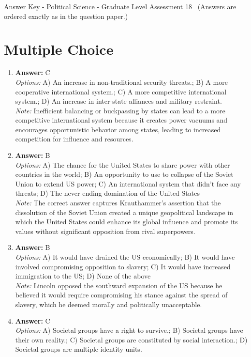 \documentclass[12pt]{article}
\begin{document}
\begin{center}
Answer Key - Political Science - Graduate Level Assessment 18 \
\small (Answers are ordered exactly as in the question paper.)
\end{center}

\section*{Multiple Choice}
\begin{enumerate}[label=\arabic*.]
\item \textbf{Answer:} C
\\ \textit{Options:} A) An increase in non-traditional security threats.; B) A more cooperative international system.; C) A more competitive international system.; D) An increase in inter-state alliances and military restraint.
\\ \textit{Note:} Inefficient balancing or buckpassing by states can lead to a more competitive international system because it creates power vacuums and encourages opportunistic behavior among states, leading to increased competition for influence and resources.
\item \textbf{Answer:} B
\\ \textit{Options:} A) The chance for the United States to share power with other countries in the world; B) An opportunity to use to collapse of the Soviet Union to extend US power; C) An international system that didn't face any threats; D) The never-ending domination of the United States
\\ \textit{Note:} The correct answer captures Krauthammer's assertion that the dissolution of the Soviet Union created a unique geopolitical landscape in which the United States could enhance its global influence and promote its values without significant opposition from rival superpowers.
\item \textbf{Answer:} B
\\ \textit{Options:} A) It would have drained the US economically; B) It would have involved compromising opposition to slavery; C) It would have increased immigration to the US; D) None of the above
\\ \textit{Note:} Lincoln opposed the southward expansion of the US because he believed it would require compromising his stance against the spread of slavery, which he deemed morally and politically unacceptable.
\item \textbf{Answer:} C
\\ \textit{Options:} A) Societal groups have a right to survive.; B) Societal groups have their own reality.; C) Societal groups are constituted by social interaction.; D) Societal groups are multiple-identity units.

\end{enumerate}
\end{document}
